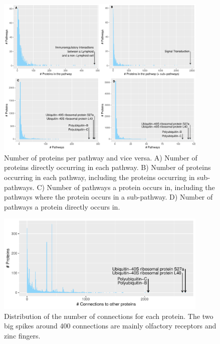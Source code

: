 \documentclass[10pt]{article}
\begin{document}
\begin{figure}
  \centering
  \includegraphics[width=0.9\textwidth]{../S3/FigureS3.pdf}
  \caption{Number of proteins per pathway and vice versa. A) Number of
    proteins directly occurring in each pathway. B) Number of proteins
    occurring in each pathway, including the proteins occurring in
    sub-pathways. C) Number of pathways a protein occurs in, including
    the pathways where the protein occurs in a sub-pathway. D) Number
    of pathways a protein directly occurs in.}
  \label{fig:s3}
\end{figure}

\begin{figure}
  \centering
  \includegraphics[width=0.9\textwidth]{../S4/FigureS4.pdf}
  \caption{Distribution of the number of connections for each protein.
    The two big spikes around 400 connections are mainly olfactory
    receptors and zinc fingers. 
  }
  \label{fig:s4}
\end{figure}
\end{document}

